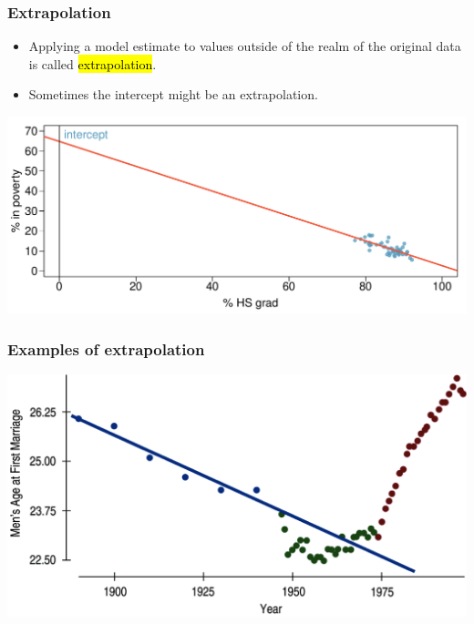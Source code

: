 \begin{frame}
\frametitle{Extrapolation}

\begin{itemize}

\item Applying a model estimate to values outside of the realm of the original data is called \hl{extrapolation}.

\item Sometimes the intercept might be an extrapolation.

\end{itemize}

\begin{center}
\includegraphics[width=\textwidth]{8-2_least_square_reg/figures/poverty/poverty_hsgrad_line_wide}
\end{center}

\end{frame}


\begin{frame}
\frametitle{Examples of extrapolation}

\begin{center}
\includegraphics[width=\textwidth]{8-2_least_square_reg/figures/extrapolation}
\end{center}

\end{frame}

